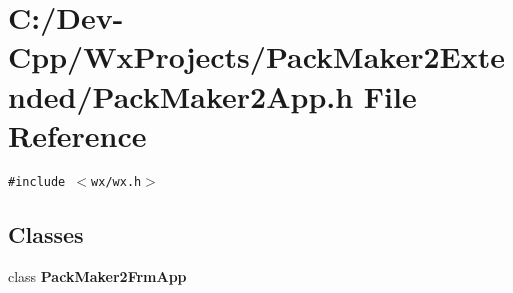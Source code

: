 \section{C:/Dev-Cpp/Wx\-Projects/Pack\-Maker2Extended/Pack\-Maker2App.h File Reference}
\label{_pack_maker2_app_8h}
{\tt \#include $<$wx/wx.h$>$}\par
\subsection*{Classes}
\begin{CompactItemize}
\item 
class {\bf Pack\-Maker2Frm\-App}
\end{CompactItemize}

